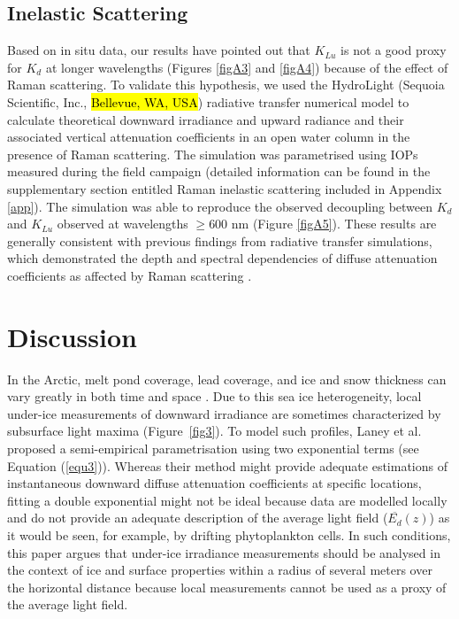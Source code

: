 \documentclass[applsci,article,accept,moreauthors,pdftex,10pt,a4paper]{Definitions/mdpi}
\newcommand{\ked}{\ensuremath{K_{d}}}
\newcommand{\klu}{\ensuremath{K_{Lu}}}
\newcommand{\meanedz}{\ensuremath{{\overline{E_d}(z)}}}
\begin{document}
\subsection{Inelastic Scattering}

Based on in situ data, our results have pointed out that \klu{} is not a good proxy for \ked{} at longer wavelengths (Figures \ref{figA3} and \ref{figA4}) because of the effect of Raman scattering. To validate this hypothesis, we used the HydroLight (Sequoia Scientific, Inc., \hl{Bellevue, WA, USA}) 
radiative transfer numerical model to calculate theoretical downward irradiance and upward radiance and their associated vertical attenuation coefficients in an open water column in the presence of Raman scattering. The simulation was parametrised using IOPs measured during the field campaign (detailed information can be found in the supplementary section entitled Raman inelastic scattering included in Appendix \ref{app}). The simulation was able to reproduce the observed decoupling between \ked{} and \klu{} observed at wavelengths $\ge$600 nm (Figure  \ref{figA5}). These results are generally consistent with previous findings from radiative transfer simulations, which demonstrated the depth and spectral dependencies of diffuse attenuation coefficients as affected by Raman scattering \citep{Li2016, Berwald1998}.

%
\section{Discussion}

In the Arctic, melt pond coverage, lead coverage, and ice and snow thickness can vary greatly in both time and space \citep{Landy2014,Eicken2004}. Due to this sea ice heterogeneity, local under-ice measurements of downward irradiance are sometimes characterized by subsurface light maxima (Figure~\ref{fig3}). To model such profiles, Laney et al. \cite{Laney2017} proposed a semi-empirical parametrisation using two exponential terms (see Equation (\ref{equ3})). Whereas their method might provide adequate estimations of instantaneous downward diffuse attenuation coefficients at specific locations, fitting a double exponential might not be ideal because data are modelled locally and do not provide an adequate description of the average light field (\meanedz{}) as it would be seen, for example, by drifting phytoplankton cells. In such conditions, this paper argues that under-ice irradiance measurements should be analysed in the context of ice and surface properties within a radius of several meters over the horizontal distance because local measurements cannot be used as a proxy of the average light field.
\end{document}
